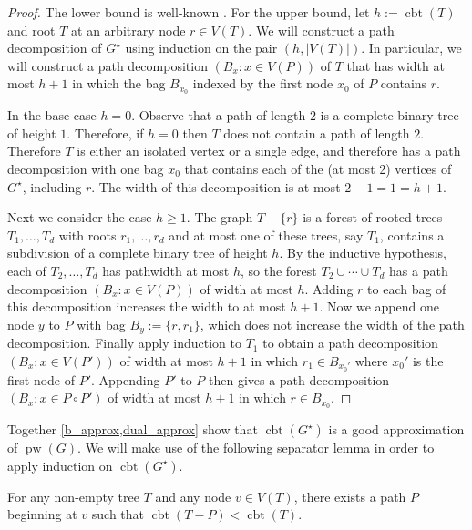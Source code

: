 \documentclass[kpfonts]{patmorin}
\DeclareMathOperator{\pw}{pw}
\DeclareMathOperator{\sh}{cbt}
\DeclareMathOperator{\cbt}{cbt}
\begin{document}
\begin{proof}
    The lower bound is well-known \cite{X}.  For the upper bound, let $h:=\sh(T)$ and root $T$ at an arbitrary node $r\in V(T)$.  We will construct a path decomposition of $G^\star$ using induction on the pair $(h, |V(T)|)$.  In particular, we will construct a path decomposition $(B_x:x\in V(P))$ of $T$ that has width at most $h+1$ in which the bag $B_{x_0}$ indexed by the first node $x_0$ of $P$ contains $r$.

    In the base case $h=0$.  Observe that a path of length $2$ is a complete binary tree of height $1$. Therefore, if $h=0$ then $T$ does not contain a path of length $2$.  Therefore $T$ is either an isolated vertex or a single edge, and therefore has a path decomposition with one bag $x_0$ that contains each of the (at most 2) vertices of $G^\star$, including $r$.  The width of this decomposition is at most $2-1=1=h+1$.

    Next we consider the case $h\ge 1$. The graph $T-\{r\}$ is a forest of rooted trees $T_1,\ldots,T_d$ with roots $r_1,\ldots,r_d$ and at most one of these trees, say $T_1$, contains a subdivision of a complete binary tree of height $h$.  By the inductive hypothesis, each of $T_2,\ldots, T_d$ has pathwidth at most $h$, so the forest $T_2\cup\cdots\cup T_d$ has a path decomposition $(B_x:x\in V(P))$ of width at most $h$. Adding $r$ to each bag of this decomposition increases the width to at most $h+1$.  Now we append one node $y$ to $P$ with bag $B_y:=\{r,r_1\}$, which does not increase the width of the path decomposition.  Finally apply induction to $T_1$ to obtain a path decomposition $(B_x:x\in V(P'))$ of width at most $h+1$ in which $r_1\in B_{x_0'}$ where $x_0'$ is the first node of $P'$.  Appending $P'$ to $P$ then gives a path decomposition $(B_x:x\in P\mathbin{\circ}P')$ of width at most $h+1$ in which $r\in B_{x_0}$.
\end{proof}

Together \cref{b_approx,dual_approx} show that $\sh(G^\star)$ is a good approximation of $\pw(G)$.  We will make use of the following separator lemma in order to apply induction on $\cbt(G^\star)$.

\begin{lem}\label{tree_cbt_separator}
    For any non-empty tree $T$ and any node $v\in V(T)$, there exists a path $P$ beginning at $v$ such that $\cbt(T-P)<\cbt(T)$.
\end{lem}
\end{document}

